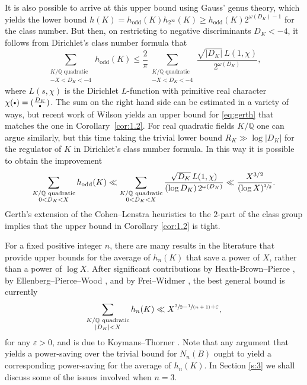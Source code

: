 \documentclass[11pt]{article}
\newcommand{\spfrac}[2]{\sfrac{#1}{(#2)}}
\newcommand{\cbullet}{{\raisebox{1pt}{$\scriptscriptstyle\bullet$}}}
\newcommand{\QQ}{\mathbb{Q}}\let\Q\QQ
\let\ve\varepsilon
\numberwithin{equation}{section}
\begin{document}
It is also possible to arrive at this upper bound using Gauss' genus theory, which yields the lower bound
$h(K)=h_{\text{odd}}(K)h_{2^\infty}(K)\geq h_{\text{odd}}(K)2^{\omega(D_K)-1}$ for the class number.
But then, on restricting to negative discriminants $D_K<-4$, it follows from
Dirichlet's class number formula that
\begin{equation}\label{eq:gerth}
\sum_{
\substack{K/\QQ \text{ quadratic}\\
-X<D_K<-4
}} h_\text{odd}(K)\leq
\frac{2}{\pi}
\sum_{
\substack{K/\QQ \text{ quadratic}\\
-X<D_K<-4
}} \frac{\sqrt{|D_K|}\,L(1,\chi)}{2^{\omega(D_K)}},
\end{equation}
where
$L(s,\chi)$ is the Dirichlet $L$-function
with primitive real character $\chi(\cbullet)=(\frac{D_K}{\cbullet})$.
The sum on the right hand side can be estimated in a variety of ways, but recent work of Wilson \cite[Cor.\,1.6]{wilson} yields an upper bound for
\eqref{eq:gerth} that matches the one in Corollary~\ref{cor:1.2}.
For real quadratic fields $K/\QQ$ one can argue similarly, but this time taking the trivial lower bound $R_K\gg \log |D_K|$ for the regulator of $K$ in Dirichlet's class number formula.
In this way it is possible to obtain the improvement
\[
\sum_{
\substack{K/\QQ \text{ quadratic}\\
0<D_K<X
}} h_\text{odd}(K)
\ll
\sum_{
\substack{K/\QQ \text{ quadratic}\\
0<D_K<X
}} \frac{\sqrt{D_K}\,L(1,\chi)}{(\log D_K)\, 2^{\omega(D_K)}}
\ll\frac{X^{3/2}}{(\log X)^{\sfrac{3}{2}}}.
\]
Gerth's \cite{gerth1,gerth2} extension of the Cohen--Lenstra heuristics to the $2$-part of the class group implies that
the upper bound in
Corollary \ref{cor:1.2} is tight.

For a fixed positive integer $n$,
there are many results in the literature
that provide
upper bounds for the average of $h_n(K)$
that save a power of $X$, rather than a power of $\log X$.
After significant contributions by
Heath-Brown--Pierce \cite{hb-p}, by
Ellenberg--Pierce--Wood
\cite{pierce2}, and
by Frei--Widmer
\cite{frei},
the best general bound is
currently
\[
\sum_{
\substack{K/\QQ \text{ quadratic}\\
|D_K|<X
}} h_n(K)\ll X^{\sfrac{3}{2}
-\spfrac{1}{n+1}+\ve},
\]
for any $\ve>0$, and is
due to Koymans--Thorner \cite{koy}.
Note that any argument that yields a power-saving over the trivial
bound for $N_n(B)$
ought to yield a corresponding power-saving for the average of $h_n(K)$.
In Section \ref{s:3} we shall discuss some of the issues involved when
$n=3$.
\end{document}

